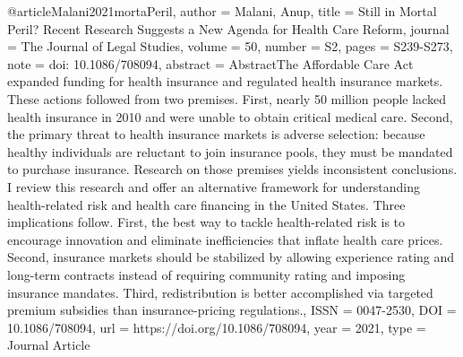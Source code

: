 {{{{%

@article{Malani2021mortaPeril,
   author = {Malani, Anup},
   title = {Still in Mortal Peril? Recent Research Suggests a New Agenda for Health Care Reform},
   journal = {The Journal of Legal Studies},
   volume = {50},
   number = {S2},
   pages = {S239-S273},
   note = {doi: 10.1086/708094},
   abstract = {AbstractThe Affordable Care Act expanded funding for health insurance and regulated health insurance markets. These actions followed from two premises. First, nearly 50 million people lacked health insurance in 2010 and were unable to obtain critical medical care. Second, the primary threat to health insurance markets is adverse selection: because healthy individuals are reluctant to join insurance pools, they must be mandated to purchase insurance. Research on those premises yields inconsistent conclusions. I review this research and offer an alternative framework for understanding health-related risk and health care financing in the United States. Three implications follow. First, the best way to tackle health-related risk is to encourage innovation and eliminate inefficiencies that inflate health care prices. Second, insurance markets should be stabilized by allowing experience rating and long-term contracts instead of requiring community rating and imposing insurance mandates. Third, redistribution is better accomplished via targeted premium subsidies than insurance-pricing regulations.},
   ISSN = {0047-2530},
   DOI = {10.1086/708094},
   url = {https://doi.org/10.1086/708094},
   year = {2021},
   type = {Journal Article}
}

}}}}
